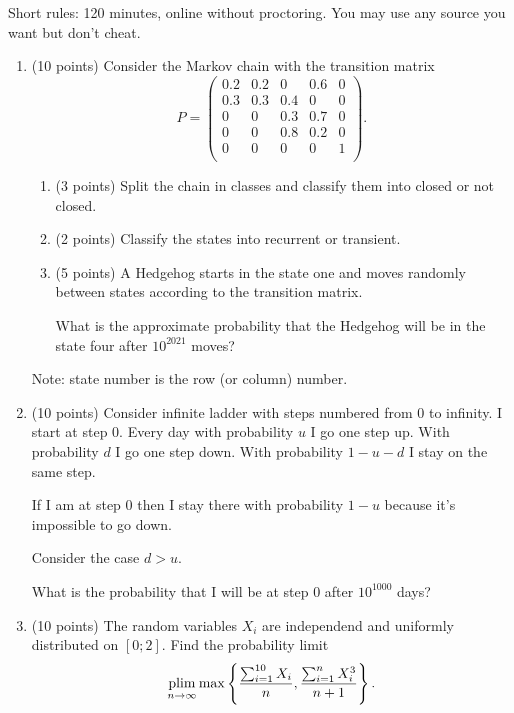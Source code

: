 Short rules: 120 minutes, online without proctoring. You may use any source you want but don't cheat.

\begin{enumerate}

\item (10 points) Consider the Markov chain with the transition matrix
\[
  P = \begin{pmatrix}
    0.2 & 0.2 & 0 & 0.6 & 0 \\
    0.3 & 0.3 & 0.4 & 0 & 0\\
    0 & 0 & 0.3 & 0.7 & 0 \\
    0 & 0 & 0.8 & 0.2 & 0 \\
    0 & 0 & 0 & 0 & 1 \\
  \end{pmatrix}.
\]

\begin{enumerate}
  \item (3 points) Split the chain in classes and classify them into closed or not closed.
  \item (2 points) Classify the states into recurrent or transient.
  \item (5 points) A Hedgehog starts in the state one and moves 
  randomly between states according to the transition matrix.

  What is the approximate probability that the Hedgehog will be in the 
  state four after $10^{2021}$ moves?
\end{enumerate}

Note: state number is the row (or column) number.

  \item (10 points) Consider infinite ladder with steps numbered from $0$ to infinity. 
  I start at step $0$. Every day with probability $u$ I go one step up.
  With probability $d$ I go one step down. With probability $1-u-d$ I stay on the same step.

  If I am at step $0$ then I stay there with probability $1-u$ because it's impossible to go down. 

  Consider the case $d>u$. 
  
  What is the probability that I will be at step $0$ after $10^{1000}$ days?

  \item %
  (10 points) The random variables $X_i$ are independend and uniformly distributed on $[0;2]$.
  Find the probability limit
\[
\operatorname*{plim}_{n\to\infty}  \max \left\{ \frac{\sum_{i=1}^{10} X_i}{n}, \frac{\sum_{i=1}^n X^3_i}{n+1} \right\}.
\]



\end{enumerate}
